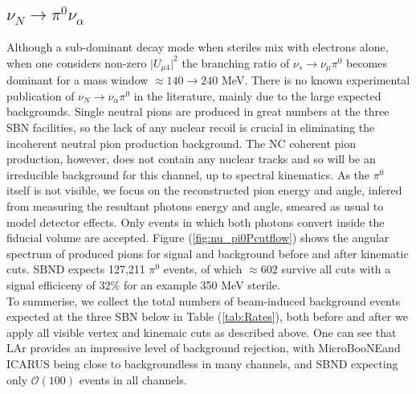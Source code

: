 \documentclass[11pt, a4paper]{article}
\def\muboone{MicroBooNE}
\begin{document}
\subsection{$\nu_N \rightarrow \pi^0 \nu_\alpha$}
Although a sub-dominant decay mode when steriles mix with electrons alone, when one considers non-zero $\vert U_{\mu4}\vert^2$ the branching ratio of $\nu_s \rightarrow \nu_\mu \pi^0$ becomes dominant for a mass window $\approx 140 \rightarrow 240$ MeV. There is no known experimental publication of $\nu_N \rightarrow \nu_\alpha \pi^0$ in the literature, mainly due to the large expected backgrounds. Single neutral pions are produced in great numbers at the three SBN facilities, so the lack of any nuclear recoil is crucial in eliminating the incoherent neutral pion production background. The NC coherent pion production, however, does not contain any nuclear tracks and so will be an irreducible background for this channel, up to spectral kinematics. As the $\pi^0$ itself is not visible, we focus on the reconstructed pion energy and angle, infered from measuring the resultant photons energy and angle, smeared as usual to model detector effects. Only events in which both photons convert inside the fiducial volume are accepted. Figure (\ref{fig:nu_pi0Pcutflow}) shows the angular spectrum of produced pions for signal and background before and after kinematic cuts. SBND expects 127,211 $\pi^0$ events, of which $\approx 602$ survive all cuts with a signal efficiceny of 32\% for an example 350 MeV sterile. \\ 

To summerise, we collect the total numbers of beam-induced background events expected at the three SBN below in Table (\ref{tab:Rates}), both before and after we apply all visible vertex and kinemaic cuts as described above. One can see that LAr provides an impressive level of background rejection, with \muboone and ICARUS being close to backgroundless in many channels, and SBND expecting only $\mathcal{O}(100)$ events in all channels.
\end{document}
